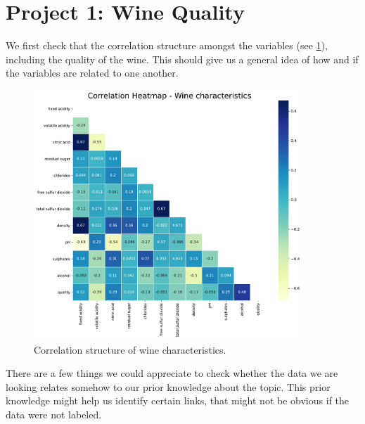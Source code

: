 \documentclass[11pt]{article}
\begin{document}
\part[wine]{Project 1: Wine Quality}

We first check that the correlation structure amongst the variables (see \cref{fig:wine_heatmap}),
including the quality of the wine.
This should give us a general idea of how and if the variables are related to one another.

\begin{figure}[h!]
    \includegraphics[width=0.9\textwidth]{figs/wine_heatmap}
    \caption{Correlation structure of wine characteristics.}
    \label{fig:wine_heatmap}
\end{figure}

There are a few things we could appreciate to check whether the data we are looking relates somehow
to our prior knowledge about the topic.
This prior knowledge might help us identify certain links, that might not be obvious if the data were not labeled.
\end{document}
